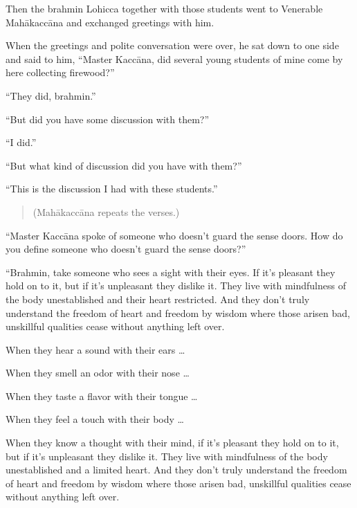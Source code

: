 \documentclass[12pt,openany]{book}%
\begin{document}
Then the brahmin Lohicca together with those students went to Venerable \textsanskrit{Mahākaccāna} and exchanged greetings with him. 

When the greetings and polite conversation were over, he sat down to one side and said to him, “Master \textsanskrit{Kaccāna}, did several young students of mine come by here collecting firewood?” 

“They did, brahmin.” 

“But did you have some discussion with them?” 

“I did.” 

“But what kind of discussion did you have with them?” 

“This is the discussion I had with these students.” 

\begin{verse}%
(\textsanskrit{Mahākaccāna} repeats the verses.) 

%
\end{verse}

“Master \textsanskrit{Kaccāna} spoke of someone who doesn’t guard the sense doors. How do you define someone who doesn’t guard the sense doors?” 

“Brahmin, take someone who sees a sight with their eyes. If it’s pleasant they hold on to it, but if it’s unpleasant they dislike it. They live with mindfulness of the body unestablished and their heart restricted. And they don’t truly understand the freedom of heart and freedom by wisdom where those arisen bad, unskillful qualities cease without anything left over. 

When they hear a sound with their ears … 

When they smell an odor with their nose … 

When they taste a flavor with their tongue … 

When they feel a touch with their body … 

When they know a thought with their mind, if it’s pleasant they hold on to it, but if it’s unpleasant they dislike it. They live with mindfulness of the body unestablished and a limited heart. And they don’t truly understand the freedom of heart and freedom by wisdom where those arisen bad, unskillful qualities cease without anything left over. 
\end{document}
